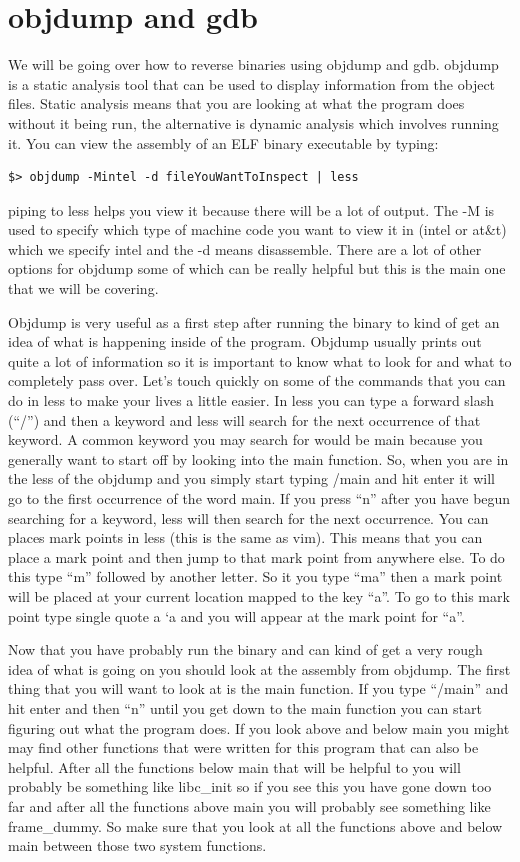 \documentclass{report}
\begin{document}
\section{objdump and gdb}
We will be going over how to reverse binaries using objdump and gdb.  objdump is a static analysis tool that can be used to display information from the object files.  Static analysis means that you are looking at what the program does without it being run, the alternative is dynamic analysis which involves running it.  You can view the assembly of an ELF binary executable by typing:
\begin{lstlisting}
$> objdump -Mintel -d fileYouWantToInspect | less
\end{lstlisting}
piping to less helps you view it because there will be a lot of output.  The -M is used to specify which type of machine code you want to view it in (intel or at\&t) which we specify intel and the -d means disassemble.  There are a lot of other options for objdump some of which can be really helpful but this is the main one that we will be covering.

Objdump is very useful as a first step after running the binary to kind of get an idea of what is happening inside of the program.  Objdump usually prints out quite a lot of information so it is important to know what to look for and what to completely pass over.  Let's touch quickly on some of the commands that you can do in less to make your lives a little easier.
In less you can type a forward slash (``/'') and then a keyword and less will search for the next occurrence of that keyword.  A common keyword you may search for would be main because you generally want to start off by looking into the main function.
So, when you are in the less of the objdump and you simply start typing /main and hit enter it will go to the first occurrence of the word main.  If you press ``n'' after you have begun searching for a keyword, less will then search for the next occurrence.  
You can places mark points in less (this is the same as vim).  This means that you can place a mark point and then jump to that mark point from anywhere else.  To do this type ``m'' followed by another letter.  So it you type ``ma'' then a mark point will be placed at your current location mapped to the key ``a''.  To go to this mark point type single quote a `a and you will appear at the mark point for ``a''.

Now that you have probably run the binary and can kind of get a very rough idea of what is going on you should look at the assembly from objdump.  The first thing that you will want to look at is the main function.  If you type ``/main'' and hit enter and then ``n'' until you get down to the main function you can start figuring out what the program does. If you look above and below main you might may find other functions that were written for this program that can also be helpful.  After all the functions below main that will be helpful to you will probably be something like libc\_init so if you see this you have gone down too far and after all the functions above main you will probably see something like frame\_dummy.  So make sure that you look at all the functions above and below main between those two system functions.
\end{document}
